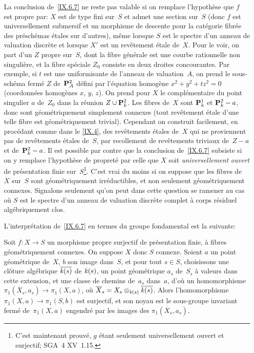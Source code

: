 \begin{remarque}
\label{IX.6.10}
La conclusion de~\ref{IX.6.7} ne reste pas valable si on remplace
l'hypoth\`ese que $f$ est propre par: $X$ est de type fini sur~$S$
et admet une section sur~$S$ (donc $f$ est universellement submersif
et un morphisme de descente pour la cat\'egorie fibr\'ee des
pr\'esch\'emas \'etales sur d'autres), m\^eme lorsque $S$ est
le spectre d'un anneau de valuation discr\`ete et lorsque $X'$ est
un rev\^etement \'etale de~$X$. Pour le voir, on part d'un $Z$
propre sur~$S$, dont la fibre g\'en\'erale
est une courbe rationnelle non singuli\`ere, et la fibre
sp\'eciale $Z_0$ consiste en deux droites concourantes. Par exemple,
si $t$ est une uniformisante de l'anneau de valuation~$A$, on prend le
sous-sch\'ema ferm\'e $Z$ de~$\mathbf{P}_A^2$ d\'efini par
l'\'equation homog\`ene $x^2+y^2+tz^2=0$ (coordonn\'ees
homog\`enes $x$, $y$, $z$). On prend pour $X$ le compl\'ementaire
du point singulier $a$ de~$Z_0$ dans la r\'eunion $Z\cup
\mathbf{P}_k^2$. Les fibres de~$X$ sont $\mathbf{P}_k^1$ et $\mathbf{P}_k^2 - a$, donc sont
g\'eom\'etriquement simplement connexes (\ie tout rev\^etement
\'etale d'une telle fibre est g\'eom\'etriquement trivial).
Cependant
on construit facilement, en proc\'edant comme dans le \No \ref{IX.4}, des
rev\^etements \'etales de~$X$ qui ne proviennent pas de
rev\^etements \'etales de~$S$, par recollement de rev\^etements
triviaux de~$Z-a$ et de~$\mathbf{P}_k^2-a$. Il est possible par contre que la
conclusion de~\ref{IX.6.7} subsiste si on y remplace l'hypoth\`ese
de propret\'e par celle que $X$ soit \emph{universellement ouvert}
de pr\'esentation finie sur~$S$\footnote{C'est maintenant
prouv\'e, $g$ \'etant seulement universellement ouvert et
surjectif; \cf SGA~4 XV~1.15.}. C'est vrai du moins si on suppose que
les fibres de~$X$ sur~$S$ sont g\'eom\'etriquement
irr\'eductibles, et non seulement g\'eom\'etriquement connexes.
Signalons seulement qu'on peut dans cette question se ramener au cas
o\`u $S$ est le spectre d'un anneau de valuation discr\`ete
complet \`a corps r\'esiduel alg\'ebriquement clos.
\end{remarque}

L'interpr\'etation de~\ref{IX.6.7} en termes du groupe fondamental
est la suivante:

\begin{corollaire}
\label{IX.6.11}
Soit $f\colon X\to S$ un morphisme propre surjectif de
pr\'esentation finie, \`a fibres g\'eom\'etriquement
connexes. On suppose $X$ donc $S$ connexe. Soient $a$ un point
g\'eom\'etrique de~$X$, $b$ son image dans~$S$, et pour tout $s\in
S$, choisissons une cl\^oture alg\'ebrique $\overline{\mathit{k}(s)}$ de
$\mathit{k}(s)$, un point g\'eom\'etrique $a_s$ de~$S_s$ \`a valeurs
dans cette extension, et une classe de chemins de~$a_s$ dans~$a$,
d'o\`u un homomorphisme $\pi_1(\overline X_s,a_s)\to \pi_1(X,a)$,
o\`u $\overline X_s=X_s\otimes_{\mathit{k}(s)}\overline{\mathit{k}(s)}$. Alors
l'homomorphisme $\pi_1(X,a)\to \pi_1(S,b)$ est surjectif, et son noyau
est le sous-groupe invariant ferm\'e de~$\pi_1(X,a)$ engendr\'e
par les images des $\pi_1(\overline X_s,a_s)$.
\end{corollaire}

